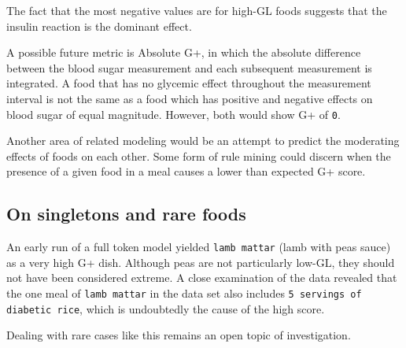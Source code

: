 \documentclass[conference]{IEEEtran}
\begin{document}
The fact that the most negative values are for high-GL foods suggests that the insulin reaction is the dominant effect.

A possible future metric is Absolute G+, in which the absolute difference between the blood sugar measurement and each subsequent measurement is integrated. A food that has no glycemic effect throughout the measurement interval is not the same as a food which has positive and negative effects on blood sugar of equal magnitude. However, both would show G+ of \texttt{0}.

Another area of related modeling would be an attempt to predict the moderating effects of foods on each other. Some form of rule mining could discern when the presence of a given food in a meal causes a lower than expected G+ score.

\subsection{On singletons and rare foods}

An early run of a full token model yielded \texttt{lamb mattar} (lamb with peas sauce) as a very high G+ dish. Although peas are not particularly low-GL, they should not have been considered extreme. A close examination of the data revealed that the one meal of \texttt{lamb mattar} in the data set also includes \texttt{5 servings of diabetic rice}, which is undoubtedly the cause of the high score.

Dealing with rare cases like this remains an open topic of investigation.




\vspace{12pt}
\end{document}
